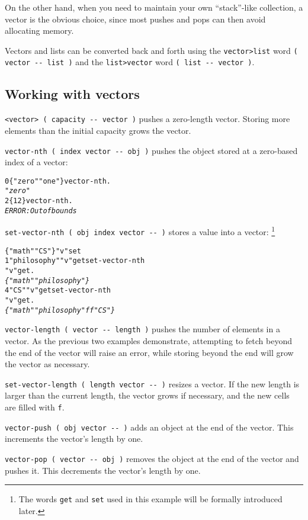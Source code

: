 \documentclass[english]{article}
\begin{document}
On the other hand, when you need to maintain your own {}``stack''-like
collection, a vector is the obvious choice, since most pushes and
pops can then avoid allocating memory.

Vectors and lists can be converted back and forth using the \texttt{vector>list}
word \texttt{( vector -{}- list )} and the \texttt{list>vector} word
\texttt{( list -{}- vector )}.


\subsection{Working with vectors}

\texttt{<vector> ( capacity -{}- vector )} pushes a zero-length vector.
Storing more elements than the initial capacity grows the vector.

\texttt{vector-nth ( index vector -{}- obj )} pushes the object stored
at a zero-based index of a vector:

\begin{alltt}
0 \{ "zero" "one" \} vector-nth .
\emph{"zero"}
2 \{ 1 2 \} vector-nth .
\emph{ERROR: Out of bounds}
\end{alltt}
\texttt{set-vector-nth ( obj index vector -{}- )} stores a value into
a vector:%
\footnote{The words \texttt{get} and \texttt{set} used in this example will
be formally introduced later.%
}

\begin{alltt}
\{ "math" "CS" \} "v" set
1 "philosophy" "v" get set-vector-nth
"v" get .
\emph{\{ "math" "philosophy" \}}
4 "CS" "v" get set-vector-nth
"v" get .
\emph{\{ "math" "philosophy" f f "CS" \}}
\end{alltt}
\texttt{vector-length ( vector -{}- length )} pushes the number of
elements in a vector. As the previous two examples demonstrate, attempting
to fetch beyond the end of the vector will raise an error, while storing
beyond the end will grow the vector as necessary.

\texttt{set-vector-length ( length vector -{}- )} resizes a vector.
If the new length is larger than the current length, the vector grows
if necessary, and the new cells are filled with \texttt{f}.

\texttt{vector-push ( obj vector -{}- )} adds an object at the end
of the vector. This increments the vector's length by one.

\texttt{vector-pop ( vector -{}- obj )} removes the object at the
end of the vector and pushes it. This decrements the vector's length
by one.
\end{document}

